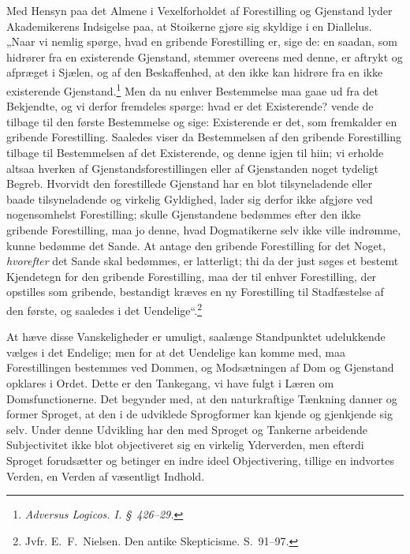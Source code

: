 \documentclass[12pt]{book}
\newcommand{\opage}[1]{\marginnote{\footnotesize\textit{[#1]}}}
\begin{document}
Med Hensyn paa det Almene i Vexelforholdet af Forestilling
og Gjenstand lyder Akademikerens Indsigelse paa, at
Stoikerne gjøre sig skyldige i en Diallelus. „Naar vi nemlig
spørge, hvad en gribende Forestilling er, sige de: en saadan,
som hidrører fra en existerende Gjenstand, stemmer overeens
med denne, er aftrykt og afpræget i Sjælen, og af den Beskaffenhed,
at den ikke kan hidrøre fra en ikke existerende
Gjenstand.\footnote{\textit{Adversus Logicos. I. §~426--29.}}%
{} Men da nu enhver Bestemmelse maa gaae ud
fra det Bekjendte, og vi derfor fremdeles spørge: hvad er det
Existerende? vende de tilbage til den første Bestemmelse og
sige: Existerende er det, som fremkalder en gribende Forestilling.
Saaledes viser da Bestemmelsen af den gribende
Forestilling tilbage til Bestemmelsen af det Existerende, og
\opage{285}denne igjen til hiin; vi erholde altsaa hverken af Gjenstandsforestillingen
eller af Gjenstanden noget tydeligt Begreb.
Hvorvidt den forestillede Gjenstand har en blot tilsyneladende
eller baade tilsyneladende og virkelig Gyldighed, lader sig derfor
ikke afgjøre ved nogensomhelst Forestilling; skulle Gjenstandene
bedømmes efter den ikke gribende Forestilling, maa
jo denne, hvad Dogmatikerne selv ikke ville indrømme, kunne
bedømme det Sande. At antage den gribende Forestilling for
det Noget, \emph{hvorefter} det Sande skal bedømmes, er latterligt;
thi da der just søges et bestemt Kjendetegn for den gribende
Forestilling, maa der til enhver Forestilling, der opstilles som
gribende, bestandigt kræves en ny Forestilling til Stadfæstelse
af den første, og saaledes i det Uendelige“.\footnote{Jvfr. E.\ F.\ Nielsen. Den antike Skepticisme. S.~91--97.}%

At hæve disse Vanskeligheder er umuligt, saalænge Standpunktet
udelukkende vælges i det Endelige; men for at det
Uendelige kan komme med, maa Forestillingen bestemmes ved
Dommen, og Modsætningen af Dom og Gjenstand opklares i
Ordet. Dette er den Tankegang, vi have fulgt i Læren om
Domsfunctionerne. Det begynder med, at den naturkraftige
Tænkning danner og former Sproget, at den i de udviklede
Sprogformer kan kjende og gjenkjende sig selv. Under denne
Udvikling har den med Sproget og Tankerne arbeidende Subjectivitet
ikke blot objectiveret sig en virkelig Yderverden, men
efterdi Sproget forudsætter og betinger en indre ideel Objectivering,
tillige en indvortes Verden, en Verden af væsentligt
Indhold.
\end{document}

